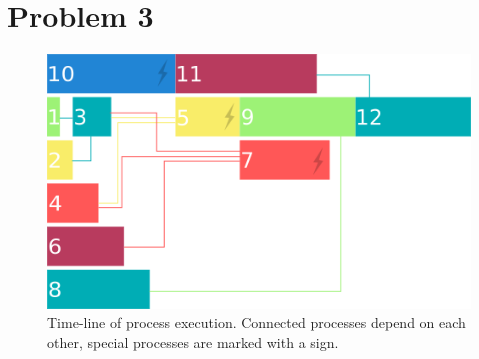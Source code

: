\documentclass[a4paper]{article}
\begin{document}
	\section{Problem 3}
	\begin{figure}[H]
		\centering
			\includegraphics[scale=0.7]{timeline.png}
		\caption{Time-line of process execution. Connected processes depend on each other, special processes are marked with a sign.}
	\end{figure}
\end{document}
